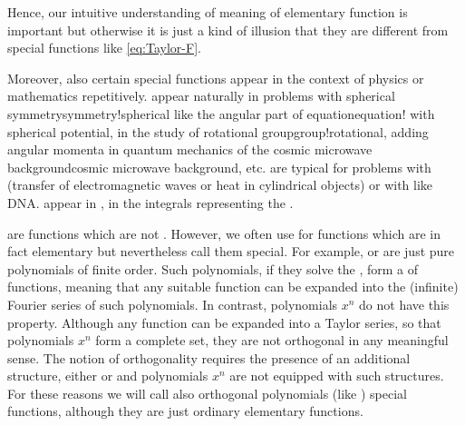 Hence, our intuitive understanding of meaning of elementary function is important but otherwise it is just a kind of illusion that they are different from special functions like \eqref{eq:Taylor-F}. 

Moreover, also certain special functions appear in the context of physics or mathematics repetitively.  appear naturally in problems with spherical symmetry{symmetry!spherical} like the angular part of \Schr equation{equation!\Schr} with spherical potential, in the study of rotational group{group!rotational}, adding angular momenta in quantum mechanics  of the cosmic microwave background{cosmic microwave background}, etc.  are typical for problems with  (transfer of electromagnetic waves or heat in cylindrical objects) or with  like DNA.  appear in , in the integrals representing the .

 are functions which are not . However, we often use for  functions which are in fact elementary but nevertheless call them special. For example,  or  are just pure polynomials of finite order. Such polynomials, if they solve the , form a   of functions, meaning that any suitable function can be expanded into the (infinite) Fourier series of such polynomials. In contrast, polynomials $x^n$ do not have this property. Although any function can be expanded into a Taylor series, so that polynomials $x^n$ form a complete set, they are not orthogonal in any meaningful sense. The notion of orthogonality requires the presence of an additional structure, either  or  and polynomials $x^n$ are not equipped with such structures. For these reasons we will call also orthogonal polynomials (like ) special functions, although they are just ordinary elementary functions. 
